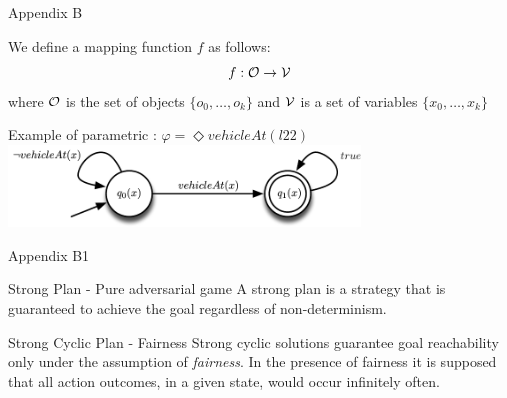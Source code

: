 \documentclass[10pt]{beamer}
\begin{document}
\begin{frame}{Appendix B}
	\begin{definition}
We define a mapping function $f$ as follows:
\begin{equation}
f: \mathcal{O} \rightarrow \mathcal{V}
\end{equation}
where $\mathcal{O}$ is the set of objects $\{o_0,\dots,o_k\}$ and $\mathcal{V}$ is a set of variables $\{x_0,\dots,x_k\}$
\end{definition}

\begin{exampleblock}{Example of parametric \DFA: $\varphi = \Diamond vehicleAt(l22)$}
\centering
\includegraphics[width=0.7\textwidth]{../images/automa-param4}
\end{exampleblock}

\end{frame}

\begin{frame}{Appendix B1}
\begin{block}{Strong Plan - Pure adversarial game}
A strong plan is a strategy that is guaranteed to achieve the goal regardless of non-determinism.
\end{block}
\begin{block}{Strong Cyclic Plan - Fairness}
Strong cyclic solutions guarantee goal reachability only under the assumption of \textit{fairness}. In the presence of fairness it is supposed that all action outcomes, in a given state, would occur infinitely often.
\end{block}
\end{frame}
\end{document}
